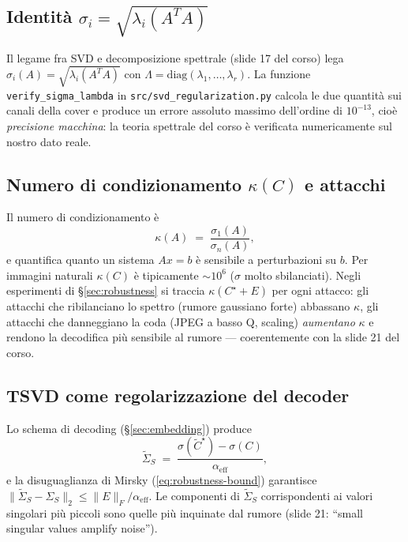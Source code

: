 \documentclass[11pt,a4paper]{article}
\theoremstyle{definition}
\theoremstyle{remark}
\begin{document}
\subsection{Identit\`a $\sigma_i = \sqrt{\lambda_i(A^T A)}$}

Il legame fra SVD e decomposizione spettrale (slide 17 del corso) lega
$\sigma_i(A) = \sqrt{\lambda_i(A^T A)}$ con $\Lambda = \mathrm{diag}(\lambda_1, \dots, \lambda_r)$.
La funzione \verb|verify_sigma_lambda| in \verb|src/svd_regularization.py|
calcola le due quantit\`a sui canali della cover e produce un errore
assoluto massimo dell'ordine di $10^{-13}$, cio\`e
\emph{precisione macchina}: la teoria spettrale del corso \`e verificata
numericamente sul nostro dato reale.

\subsection{Numero di condizionamento $\kappa(C)$ e attacchi}

Il numero di condizionamento \`e
\begin{equation}\label{eq:kappa}
   \kappa(A) \;=\; \frac{\sigma_1(A)}{\sigma_n(A)},
\end{equation}
e quantifica quanto un sistema $A x = b$ \`e sensibile a perturbazioni
su $b$.  Per immagini naturali $\kappa(C)$ \`e tipicamente $\sim 10^{6}$
($\sigma$ molto sbilanciati).  Negli esperimenti di \S\ref{sec:robustness}
si traccia $\kappa(C^{\star} + E)$ per ogni attacco: gli attacchi che
ribilanciano lo spettro (rumore gaussiano forte) abbassano $\kappa$, gli
attacchi che danneggiano la coda (JPEG a basso Q, scaling)
\emph{aumentano} $\kappa$ e rendono la decodifica pi\`u sensibile al
rumore --- coerentemente con la slide 21 del corso.

\subsection{TSVD come regolarizzazione del decoder}
\label{sec:tsvd-decoder}

Lo schema di decoding (\S\ref{sec:embedding}) produce
\[
   \widetilde\Sigma_S \;=\; \frac{\sigma(\widetilde C^{\star}) - \sigma(C)}{\alpha_{\text{eff}}},
\]
e la disuguaglianza di Mirsky (\eqref{eq:robustness-bound}) garantisce
\(
   \|\widetilde\Sigma_S - \Sigma_S\|_2 \leq \|E\|_F / \alpha_{\text{eff}}.
\)
Le componenti di $\widetilde\Sigma_S$ corrispondenti ai valori
singolari pi\`u piccoli sono quelle pi\`u inquinate dal rumore (slide 21:
``small singular values amplify noise'').
\end{document}
